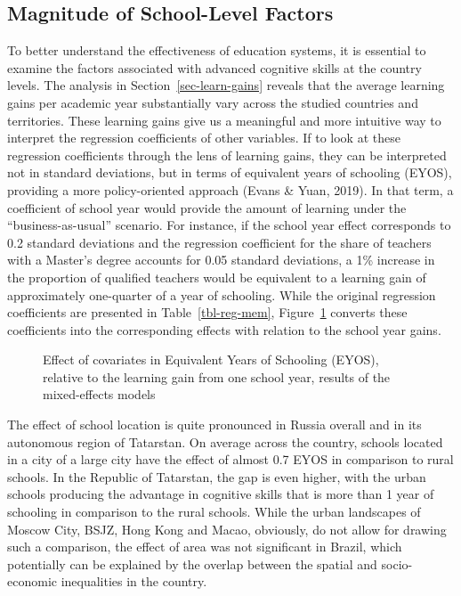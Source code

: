 \documentclass[
]{article}
\begin{document}
\subsection{Magnitude of School-Level
Factors}\label{magnitude-of-school-level-factors}

To better understand the effectiveness of education systems, it is
essential to examine the factors associated with advanced cognitive
skills at the country levels. The analysis in
Section~\ref{sec-learn-gains} reveals that the average learning gains
per academic year substantially vary across the studied countries and
territories. These learning gains give us a meaningful and more
intuitive way to interpret the regression coefficients of other
variables. If to look at these regression coefficients through the lens
of learning gains, they can be interpreted not in standard deviations,
but in terms of equivalent years of schooling (EYOS), providing a more
policy-oriented approach (Evans \& Yuan, 2019). In that term, a
coefficient of school year would provide the amount of learning under
the ``business-as-usual'' scenario. For instance, if the school year
effect corresponds to 0.2 standard deviations and the regression
coefficient for the share of teachers with a Master's degree accounts
for 0.05 standard deviations, a 1\% increase in the proportion of
qualified teachers would be equivalent to a learning gain of
approximately one-quarter of a year of schooling. While the original
regression coefficients are presented in Table~\ref{tbl-reg-mem},
Figure~\ref{fig-eyos} converts these coefficients into the corresponding
effects with relation to the school year gains.

\begin{figure}


\caption{\label{fig-eyos}Effect of covariates in Equivalent Years of
Schooling (EYOS), relative to the learning gain from one school year,
results of the mixed-effects models}

\end{figure}%

The effect of school location is quite pronounced in Russia overall and
in its autonomous region of Tatarstan. On average across the country,
schools located in a city of a large city have the effect of almost 0.7
EYOS in comparison to rural schools. In the Republic of Tatarstan, the
gap is even higher, with the urban schools producing the advantage in
cognitive skills that is more than 1 year of schooling in comparison to
the rural schools. While the urban landscapes of Moscow City, BSJZ, Hong
Kong and Macao, obviously, do not allow for drawing such a comparison,
the effect of area was not significant in Brazil, which potentially can
be explained by the overlap between the spatial and socio-economic
inequalities in the country.
\end{document}
